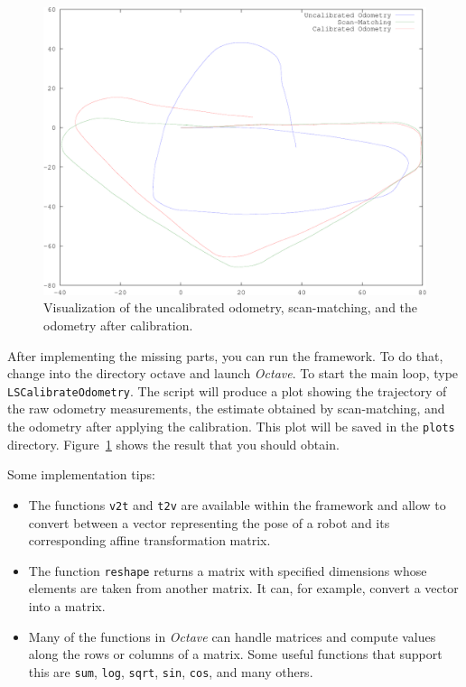 \documentclass[12pt]{article}
\begin{document}
\begin{figure}
  \centering
  \includegraphics[width=0.8\columnwidth]{odometry-calibration}
  \caption{Visualization of the uncalibrated odometry, scan-matching,
  and the odometry after calibration.}
  \label{fig:result}
\end{figure}

After implementing the missing parts, you can run the framework.  To do
that, change into the directory octave and launch \emph{Octave}. To
start the main loop, type \texttt{LSCalibrateOdometry}.  The script will
produce a plot showing the trajectory of the raw odometry measurements,
the estimate obtained by scan-matching, and the odometry after applying
the calibration.  This plot will be saved in the \texttt{plots}
directory. Figure~\ref{fig:result} shows the result that you should obtain.

\newpage
Some implementation tips:
\begin{itemize}
  \item
    The functions \texttt{v2t} and \texttt{t2v} are available within the
    framework and allow to convert between a vector representing the
    pose of a robot and its corresponding affine transformation matrix.
  \item
    The function \texttt{reshape} returns a matrix with specified
    dimensions whose elements are taken from another matrix. It can, for
    example, convert a vector into a matrix.
  \item
    Many of the functions in \emph{Octave} can handle matrices and
    compute values along the rows or columns of a matrix. Some useful
    functions that support this are \texttt{sum},  \texttt{log},
    \texttt{sqrt}, \texttt{sin}, \texttt{cos}, and many others.
\end{itemize}
\end{document}

